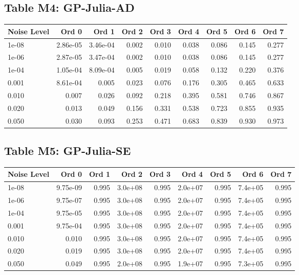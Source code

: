 \clearpage

\subsection*{Table M4: GP-Julia-AD}

\begin{longtable}{lrrrrrrrr}
\toprule
\textbf{Noise Level} & \textbf{Ord 0} & \textbf{Ord 1} & \textbf{Ord 2} & \textbf{Ord 3} & \textbf{Ord 4} & \textbf{Ord 5} & \textbf{Ord 6} & \textbf{Ord 7} \\
\midrule
\endhead
1e-08 & 2.86e-05 & 3.46e-04 & 0.002 & 0.010 & 0.038 & 0.086 & 0.145 & 0.277 \\
1e-06 & 2.87e-05 & 3.47e-04 & 0.002 & 0.010 & 0.038 & 0.086 & 0.145 & 0.277 \\
1e-04 & 1.05e-04 & 8.09e-04 & 0.005 & 0.019 & 0.058 & 0.132 & 0.220 & 0.376 \\
0.001 & 8.61e-04 & 0.005 & 0.023 & 0.076 & 0.176 & 0.305 & 0.465 & 0.633 \\
0.010 & 0.007 & 0.026 & 0.092 & 0.218 & 0.395 & 0.581 & 0.746 & 0.867 \\
0.020 & 0.013 & 0.049 & 0.156 & 0.331 & 0.538 & 0.723 & 0.855 & 0.935 \\
0.050 & 0.030 & 0.093 & 0.253 & 0.471 & 0.683 & 0.839 & 0.930 & 0.973 \\
\bottomrule
\end{longtable}

\clearpage

\subsection*{Table M5: GP-Julia-SE}

\begin{longtable}{lrrrrrrrr}
\toprule
\textbf{Noise Level} & \textbf{Ord 0} & \textbf{Ord 1} & \textbf{Ord 2} & \textbf{Ord 3} & \textbf{Ord 4} & \textbf{Ord 5} & \textbf{Ord 6} & \textbf{Ord 7} \\
\midrule
\endhead
1e-08 & 9.75e-09 & 0.995 & 3.0e+08 & 0.995 & 2.0e+07 & 0.995 & 7.4e+05 & 0.995 \\
1e-06 & 9.75e-07 & 0.995 & 3.0e+08 & 0.995 & 2.0e+07 & 0.995 & 7.4e+05 & 0.995 \\
1e-04 & 9.75e-05 & 0.995 & 3.0e+08 & 0.995 & 2.0e+07 & 0.995 & 7.4e+05 & 0.995 \\
0.001 & 9.75e-04 & 0.995 & 3.0e+08 & 0.995 & 2.0e+07 & 0.995 & 7.4e+05 & 0.995 \\
0.010 & 0.010 & 0.995 & 3.0e+08 & 0.995 & 2.0e+07 & 0.995 & 7.4e+05 & 0.995 \\
0.020 & 0.019 & 0.995 & 3.0e+08 & 0.995 & 2.0e+07 & 0.995 & 7.4e+05 & 0.995 \\
0.050 & 0.049 & 0.995 & 2.0e+08 & 0.995 & 1.9e+07 & 0.995 & 7.3e+05 & 0.995 \\
\bottomrule
\end{longtable}


